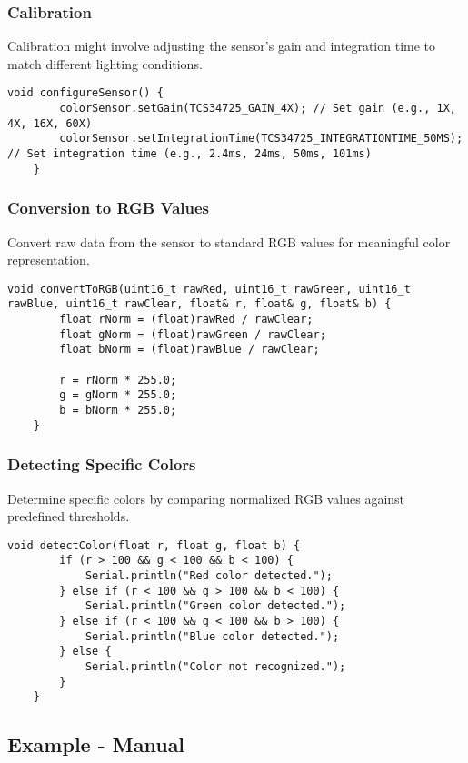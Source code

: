 \subsubsection*{Calibration}
Calibration might involve adjusting the sensor’s gain and integration time to match different lighting conditions.

\begin{lstlisting}[caption=Setting Gain and Integration Time]
	void configureSensor() {
		colorSensor.setGain(TCS34725_GAIN_4X); // Set gain (e.g., 1X, 4X, 16X, 60X)
		colorSensor.setIntegrationTime(TCS34725_INTEGRATIONTIME_50MS); // Set integration time (e.g., 2.4ms, 24ms, 50ms, 101ms)
	}
\end{lstlisting}

\subsubsection*{Conversion to RGB Values}
Convert raw data from the sensor to standard RGB values for meaningful color representation.

\begin{lstlisting}[caption=Conversion to RGB Values]
	void convertToRGB(uint16_t rawRed, uint16_t rawGreen, uint16_t rawBlue, uint16_t rawClear, float& r, float& g, float& b) {
		float rNorm = (float)rawRed / rawClear;
		float gNorm = (float)rawGreen / rawClear;
		float bNorm = (float)rawBlue / rawClear;
		
		r = rNorm * 255.0;
		g = gNorm * 255.0;
		b = bNorm * 255.0;
	}
\end{lstlisting}

\subsubsection*{Detecting Specific Colors}
Determine specific colors by comparing normalized RGB values against predefined thresholds.

\begin{lstlisting}[caption=Color Detection]
	void detectColor(float r, float g, float b) {
		if (r > 100 && g < 100 && b < 100) {
			Serial.println("Red color detected.");
		} else if (r < 100 && g > 100 && b < 100) {
			Serial.println("Green color detected.");
		} else if (r < 100 && g < 100 && b > 100) {
			Serial.println("Blue color detected.");
		} else {
			Serial.println("Color not recognized.");
		}
	}
\end{lstlisting}

\subsection{Example - Manual}


